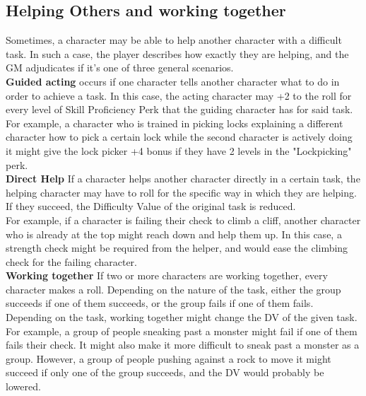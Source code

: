 \subsection{Helping Others and working together}
Sometimes, a character may be able to help another character with a difficult task. In such a case, the player describes how exactly they are helping, and the GM adjudicates if it's one of three general scenarios.\\
\textbf{Guided acting} occurs if one character tells another character what to do in order to achieve a task. In this case, the acting character may +2 to the roll for every level of Skill Proficiency Perk that the guiding character has for said task.\\
For example, a character who is trained in picking locks explaining a different character how to pick a certain lock while the second character is actively doing it might give the lock picker +4 bonus if they have 2 levels in the "Lockpicking" perk.\\
\textbf{Direct Help} If a character helps another character directly in a certain task, the helping character may have to roll for the specific way in which they are helping. If they succeed, the Difficulty Value of the original task is reduced.\\
For example, if a character is failing their check to climb a cliff, another character who is already at the top might reach down and help them up. In this case, a strength check might be required from the helper, and would ease the climbing check for the failing character.\\
\textbf{Working together} If two or more characters are working together, every character makes a roll. Depending on the nature of the task, either the group succeeds if one of them succeeds, or the group fails if one of them fails.\\ Depending on the task, working together might change the DV of the given task.\\
For example, a group of people sneaking past a monster might fail if one of them fails their check. It might also make it more difficult to sneak past a monster as a group. However, a group of people pushing against a rock to move it might succeed if only one of the group succeeds, and the DV would probably be lowered.

